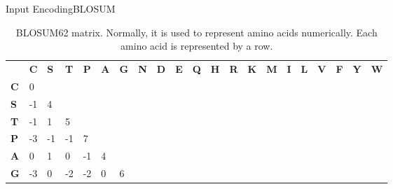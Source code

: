 \documentclass[10pt]{beamer}
\newcommand{\1}{
	\setbeamertemplate{background}{
		\texttt{[image: img/1]}
		\tikz[overlay] \fill[fill opacity=0.75,fill=white] (0,0) rectangle (-\paperwidth,\paperheight);
	}
}
\begin{document}
\begin{frame}{Input Encoding}{BLOSUM}	
	\begin{table}[]
		\tiny
		\centering
		\caption{BLOSUM62 matrix. Normally, it is used to represent amino acids numerically. Each amino acid is represented by a row.}
		\label{tab:blosum62}
		\setlength{\tabcolsep}{0.5em} %
		{\renewcommand{\arraystretch}{1.2}%
			
			
			\begin{tabular}{lllllllllllllllllllll}
				& \textbf{C} & \textbf{S} & \textbf{T} & \textbf{P} & \textbf{A} & \textbf{G} & \textbf{N} & \textbf{D} & \textbf{E} & \textbf{Q} & \textbf{H} & \textbf{R} & \textbf{K} & \textbf{M} & \textbf{I} & \textbf{L} & \textbf{V} & \textbf{F} & \textbf{Y} & \textbf{W} \\
				\textbf{C} & 0          &            &            &            &            &            &            &            &            &            &            &            &            &            &            &            &            &            &            &            \\
				\textbf{S} & -1         & 4          &            &            &            &            &            &            &            &            &            &            &            &            &            &            &            &            &            &            \\
				\textbf{T} & -1         & 1          & 5          &            &            &            &            &            &            &            &            &            &            &            &            &            &            &            &            &            \\
				\textbf{P} & -3         & -1         & -1         & 7          &            &            &            &            &            &            &            &            &            &            &            &            &            &            &            &            \\
				\textbf{A} & 0          & 1          & 0          & -1         & 4          &            &            &            &            &            &            &            &            &            &            &            &            &            &            &            \\
				\textbf{G} & -3         & 0          & -2         & -2         & 0          & 6          &            &            &            &            &            &            &            &            &            &            &            &            &            &            \\

\end{tabular}}
\end{table}
\end{frame}
\end{document}
